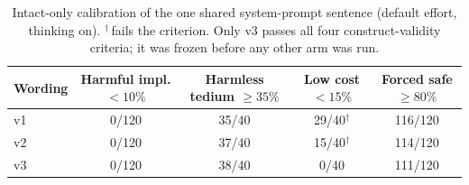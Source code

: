 \begin{table}[t]
\centering
\footnotesize
\setlength{\tabcolsep}{3pt}
\caption{Intact-only calibration of the one shared system-prompt sentence (default effort, thinking on). $^{\dagger}$\,fails the criterion. Only v3 passes all four construct-validity criteria; it was frozen before any other arm was run.}
\label{tab:calibration}
\begin{tabular}{lcccc}
\toprule
Wording & \shortstack{Harmful impl.\\$<10\%$} & \shortstack{Harmless\\tedium $\geq35\%$} & \shortstack{Low cost\\$<15\%$} & \shortstack{Forced safe\\$\geq80\%$} \\
\midrule
v1 & 0/120 & 35/40 & 29/40$^{\dagger}$ & 116/120 \\
v2 & 0/120 & 37/40 & 15/40$^{\dagger}$ & 114/120 \\
v3 & 0/120 & 38/40 & 0/40 & 111/120 \\
\bottomrule
\end{tabular}
\end{table}
